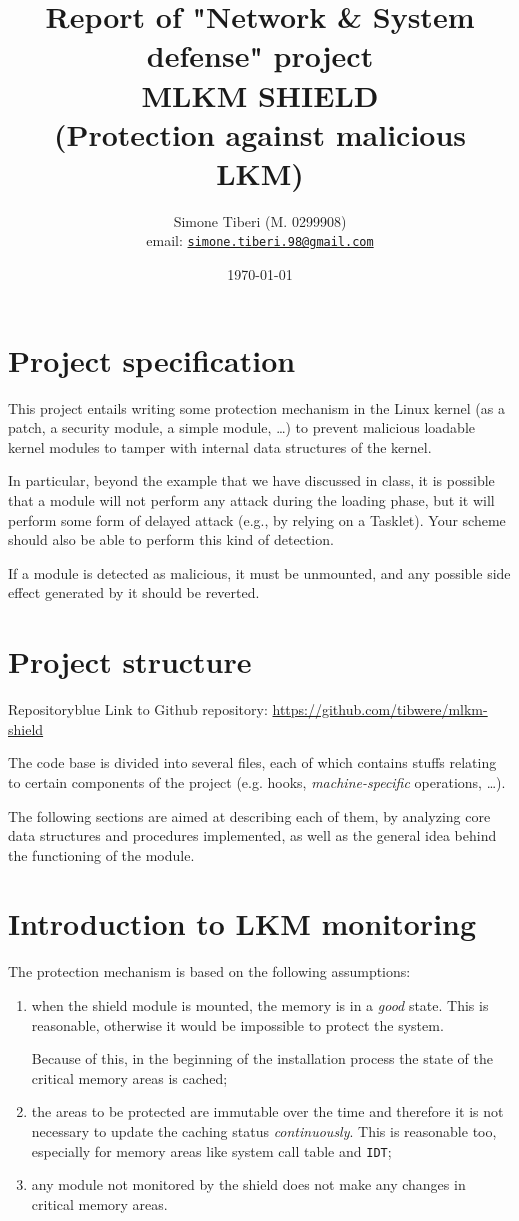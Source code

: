 \documentclass{article}
\title{\small Report of "Network \& System defense" project \\
\Huge \textbf{MLKM SHIELD}\\
\Large (Protection against malicious LKM)}
\author{Simone Tiberi (M. 0299908)\\%
email: \texttt{\href{mailto:simone.tiberi.98@gmail.com}{simone.tiberi.98@gmail.com}}}
\date{\today}
\begin{document}
	\maketitle
	\tableofcontents
	\newpage

	\section{Project specification}
	This project entails writing some protection mechanism in the Linux kernel (as a patch, a security module, a simple
	module, \dots) to prevent malicious loadable kernel modules to tamper with internal data structures of the kernel.

	In particular, beyond the example that we have discussed in class, it is possible that a module will not perform
	any attack during the loading phase, but it will perform some form of delayed attack (e.g., by relying on a
	Tasklet). Your scheme should also be able to perform this kind of detection.

	If a module is detected as malicious, it must be unmounted, and any possible side effect generated by it should be
	reverted.

	\section{Project structure}
	\begin{custombox}{Repository}{blue}
		Link to Github repository: \url{https://github.com/tibwere/mlkm-shield}
	\end{custombox}

	The code base is divided into several files, each of which contains stuffs relating to certain components of the
	project (e.g. hooks, \textit{machine-specific} operations, \dots).

	The following sections are aimed at describing each of them, by analyzing core data structures and procedures implemented, as well as the general idea behind the functioning of the module.

	\section{Introduction to LKM monitoring}
	The protection mechanism is based on the following assumptions:
	\begin{enumerate}
		\item when the shield module is mounted, the memory is in a \textit{good} state. This is reasonable, otherwise
		it would be impossible to protect the system.

		Because of this, in the beginning of the installation process the state of the critical memory areas is cached;

		\item the areas to be protected are immutable over the time and therefore it is not necessary to update the
		caching status \textit{continuously}. This is reasonable too, especially for memory areas like system call table and \texttt{IDT};

		\item any module not monitored by the shield does not make any changes in critical memory areas.
	\end{enumerate}
\end{document}
